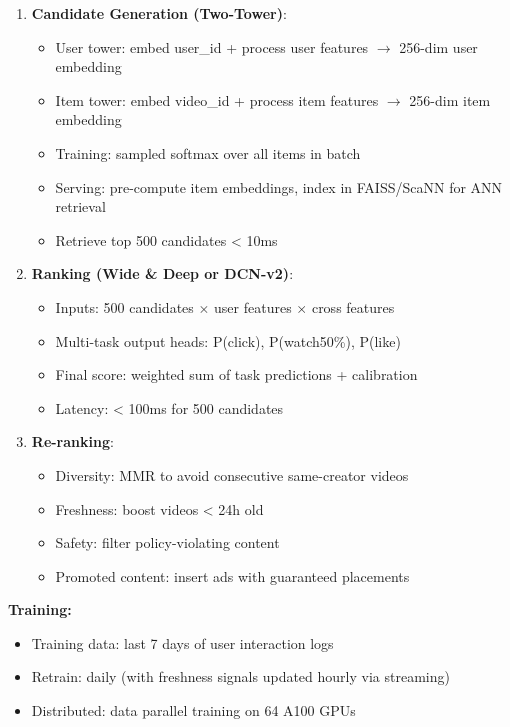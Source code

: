 \documentclass[11pt]{article}
\providecommand{\tightlist}{\setlength{\itemsep}{1pt}\setlength{\parskip}{0pt}}
\begin{document}
\begin{enumerate}
\def\labelenumi{\arabic{enumi}.}
\item
  \textbf{Candidate Generation (Two-Tower)}:

  \begin{itemize}
  \tightlist
  \item
    User tower: embed user\_id + process user features \(\rightarrow\) 256-dim user embedding
  \item
    Item tower: embed video\_id + process item features \(\rightarrow\) 256-dim item embedding
  \item
    Training: sampled softmax over all items in batch
  \item
    Serving: pre-compute item embeddings, index in FAISS/ScaNN for ANN retrieval
  \item
    Retrieve top 500 candidates \textless{} 10ms
  \end{itemize}
\item
  \textbf{Ranking (Wide \& Deep or DCN-v2)}:

  \begin{itemize}
  \tightlist
  \item
    Inputs: 500 candidates \(\times\) user features \(\times\) cross features
  \item
    Multi-task output heads: P(click), P(watch50\%), P(like)
  \item
    Final score: weighted sum of task predictions + calibration
  \item
    Latency: \textless{} 100ms for 500 candidates
  \end{itemize}
\item
  \textbf{Re-ranking}:

  \begin{itemize}
  \tightlist
  \item
    Diversity: MMR to avoid consecutive same-creator videos
  \item
    Freshness: boost videos \textless{} 24h old
  \item
    Safety: filter policy-violating content
  \item
    Promoted content: insert ads with guaranteed placements
  \end{itemize}
\end{enumerate}

\textbf{Training:}

\begin{itemize}
\tightlist
\item
  Training data: last 7 days of user interaction logs
\item
  Retrain: daily (with freshness signals updated hourly via streaming)
\item
  Distributed: data parallel training on 64 A100 GPUs
\end{itemize}
\end{document}
